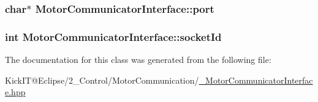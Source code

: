\subsubsection[{\texorpdfstring{port}{port}}]{\setlength{\rightskip}{0pt plus 5cm}char$\ast$ Motor\+Communicator\+Interface\+::port\hspace{0.3cm}{\ttfamily [protected]}}\hypertarget{class_motor_communicator_interface_adde2a840f8e9cd2e43b34af2bf8c3719}{}\label{class_motor_communicator_interface_adde2a840f8e9cd2e43b34af2bf8c3719}
\subsubsection[{\texorpdfstring{socket\+Id}{socketId}}]{\setlength{\rightskip}{0pt plus 5cm}int Motor\+Communicator\+Interface\+::socket\+Id\hspace{0.3cm}{\ttfamily [protected]}}\hypertarget{class_motor_communicator_interface_ad4d2f463fa6182b86bee4852dcee3d3a}{}\label{class_motor_communicator_interface_ad4d2f463fa6182b86bee4852dcee3d3a}


The documentation for this class was generated from the following file\+:\begin{DoxyCompactItemize}
\item 
Kick\+I\+T@\+Eclipse/2\+\_\+\+Control/\+Motor\+Communication/\hyperlink{___motor_communicator_interface_8hpp}{\+\_\+\+Motor\+Communicator\+Interface.\+hpp}\end{DoxyCompactItemize}
